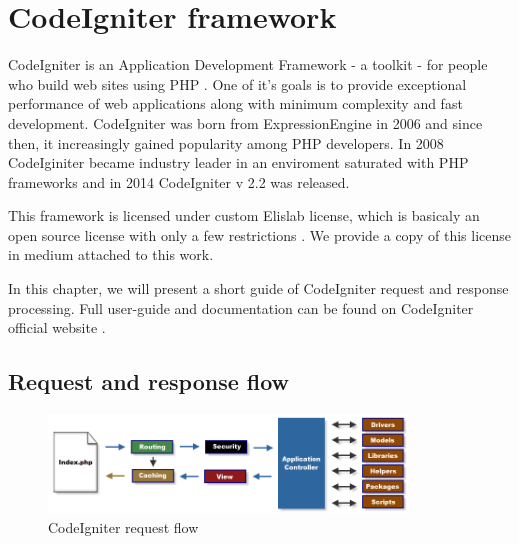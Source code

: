 \chapter{CodeIgniter framework}




CodeIgniter is an Application Development Framework - a toolkit - for people who build web sites using PHP  \cite{codeigniter}. One of it's goals is to provide exceptional performance of web applications along with minimum complexity and fast development. CodeIgniter was born from ExpressionEngine \cite{elislab} in 2006 and since then, it increasingly gained popularity among PHP developers. In 2008 CodeIginiter became industry leader in an enviroment saturated with PHP frameworks \cite{elislab} and in 2014 CodeIgniter v 2.2 was released.


This framework is licensed under custom Elislab license, which is basicaly an open source license with only a few restrictions \cite{elislablicense}. We provide a copy of this license in medium attached to this work.


In this chapter, we will present a short guide of CodeIgniter request and response processing. Full user-guide and documentation can be found on CodeIgniter official website \cite{codeigniter}.


\section{Request and response flow}

\begin{figure}[h]
    \centering
    \includegraphics[width=0.85\textwidth]{images/codeigniter.png}
    \caption{CodeIgniter request flow}
    \label{codeigniter_flow}
\end{figure}


